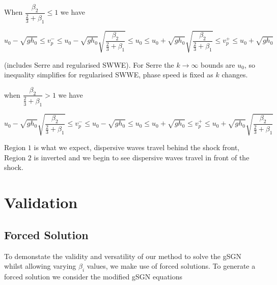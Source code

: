 \documentclass[10pt]{article}
\begin{document}
When $\dfrac{\beta_2}{\frac{2}{3} + \beta_1} \le 1$ we have

\begin{equation}
u_0 -  \sqrt{gh_0} \le  v^-_p \le u_0 - \sqrt{gh_0} \sqrt{\dfrac{\beta_2}{\frac{2}{3} + \beta_1}} \le u_0 \le u_0 + \sqrt{gh_0} \sqrt{\dfrac{\beta_2}{\frac{2}{3} + \beta_1}} \le   v^+_p  \le u_0 +   \sqrt{gh_0}
\end{equation}

(includes Serre and regularised SWWE). For Serre the $k \rightarrow \infty $ bounds are $u_0$, so inequality simplifies for regularised SWWE, phase speed is fixed as $k$ changes. 

when $\dfrac{\beta_2}{\frac{2}{3} + \beta_1} > 1$ we have

\begin{equation}
u_0 - \sqrt{gh_0} \sqrt{\dfrac{\beta_2}{\frac{2}{3} + \beta_1}} \le v^-_p \le u_0 -  \sqrt{gh_0} \le  u_0 \le u_0 + \sqrt{gh_0} \le   v^+_p  \le u_0 +  \sqrt{gh_0} \sqrt{\dfrac{\beta_2}{\frac{2}{3} + \beta_1}}
\end{equation}

Region $1$ is what we expect, dispersive waves travel behind the shock front, Region $2$ is inverted and we begin to see dispersive waves travel in front of the shock. 




\section{Validation}

\subsection{Forced Solution}
To demonstate the validity and versatility of our method to solve the gSGN whilst allowing varying $\beta_i$ values, we make use of forced solutions. To generate a forced solution we consider the modified gSGN equations 
\end{document}
